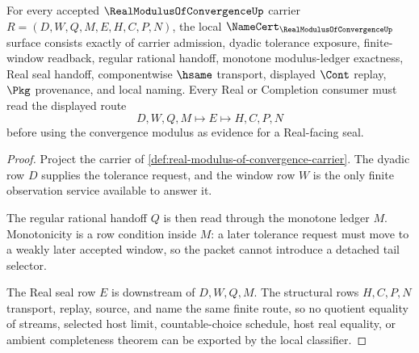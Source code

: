 \begin{theorem}
\label{thm:real-modulus-of-convergence-namecert-obligations}
For every accepted $\RealModulusOfConvergenceUp$ carrier $R=(D,W,Q,M,E,H,C,P,N)$, the local $\NameCert_{\RealModulusOfConvergenceUp}$ surface consists exactly of carrier admission, dyadic tolerance exposure, finite-window readback, regular rational handoff, monotone modulus-ledger exactness, Real seal handoff, componentwise $\hsame$ transport, displayed $\Cont$ replay, $\Pkg$ provenance, and local naming. Every Real or Completion consumer must read the displayed route
$$
D,W,Q,M \longmapsto E \longmapsto H,C,P,N
$$
before using the convergence modulus as evidence for a Real-facing seal.
\end{theorem}
\begin{proof}
Project the carrier of \autoref{def:real-modulus-of-convergence-carrier}. The dyadic row $D$ supplies the tolerance request, and the window row $W$ is the only finite observation service available to answer it.

The regular rational handoff $Q$ is then read through the monotone ledger $M$. Monotonicity is a row condition inside $M$: a later tolerance request must move to a weakly later accepted window, so the packet cannot introduce a detached tail selector.

The Real seal row $E$ is downstream of $D,W,Q,M$. The structural rows $H,C,P,N$ transport, replay, source, and name the same finite route, so no quotient equality of streams, selected host limit, countable-choice schedule, host real equality, or ambient completeness theorem can be exported by the local classifier.
\end{proof}

